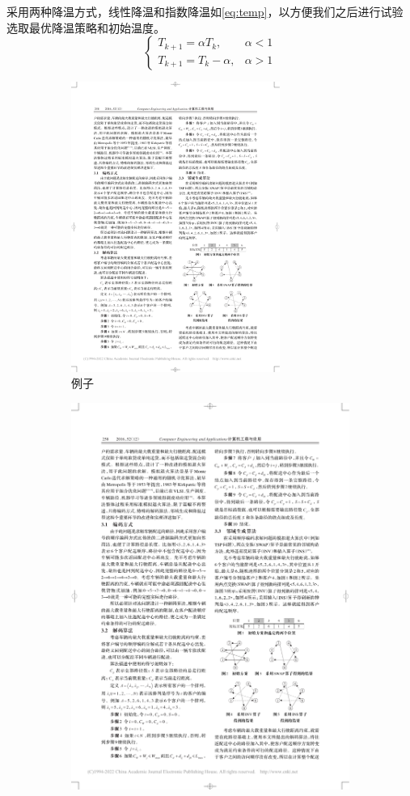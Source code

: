 \documentclass{nudt}
\begin{document}
采用两种降温方式，线性降温和指数降温如\cref{eq:temp}，以方便我们之后进行试验选取最优降温策略和初始温度。
\begin{equation}\label{eq:temp}
	\left\{
		\begin{array}{lr}
			T_{k+1}=\alpha T_{k}, &  \alpha<1\\
			T_{k+1}=T_{k}-\alpha, &  \alpha>1
		\end{array}
		\right.
\end{equation}
\begin{figure}[H]
	\centering
	\begin{subfigure}{\linewidth}
		\centering
		\includegraphics[width=0.75\textwidth]{image/算子.pdf}
		\caption{例子}
		\label{fig:example}%
	\end{subfigure}
	\centering
	\begin{subfigure}{0.325\linewidth}
		\centering
		\includegraphics[height=0.75\linewidth]{image/原始.pdf}

\end{subfigure}
\end{figure}
\end{document}
